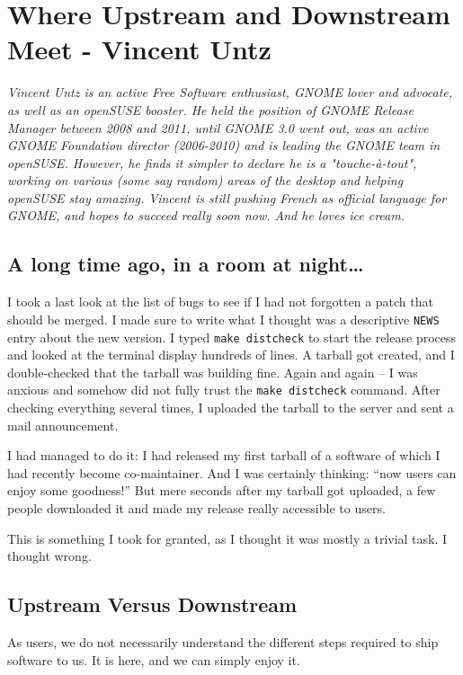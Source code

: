 \chapter{Where Upstream and Downstream Meet - Vincent Untz}

\textit{Vincent Untz is an active Free Software enthusiast, GNOME lover and
advocate, as well as an openSUSE booster. He held the position of GNOME Release
Manager between 2008 and 2011, until GNOME 3.0 went out, was an active GNOME
Foundation director (2006-2010) and is leading the GNOME team in openSUSE.
However, he finds it simpler to declare he is a "touche-\`{a}-tout", working on
various (some say random) areas of the desktop and helping openSUSE stay
amazing. Vincent is still pushing French as official language for GNOME, and
hopes to succeed really soon now. And he loves ice cream.}

\section*{A long time ago, in a room at night\ldots}

I took a last look at the list of bugs to see if I had not forgotten a patch
that should be merged. I made sure to write what I thought was a descriptive
\texttt{NEWS} entry about the new version. I typed \texttt{make distcheck} to
start the release process and looked at the terminal display hundreds of lines.
A tarball got created, and I double-checked that the tarball was building fine.
Again and again -- I was anxious and somehow did not fully trust the
\texttt{make distcheck} command. After checking everything several times, I
uploaded the tarball to the server and sent a mail announcement.

I had managed to do it: I had released my first tarball of a software of which
I had recently become co-maintainer. And I was certainly thinking: ``now users
can enjoy some goodness!'' But mere seconds after my tarball got uploaded, a few
people downloaded it and made my release really accessible to users.

This is something I took for granted, as I thought it was mostly a trivial
task. I thought wrong.

\section*{Upstream Versus Downstream}

As users, we do not necessarily understand the different steps required to ship
software to us. It is here, and we can simply enjoy it.

